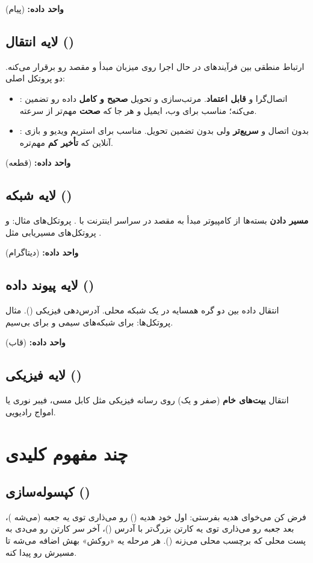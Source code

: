 \textbf{واحد داده:}  (پیام)

\subsection{لایه انتقال ()}
ارتباط منطقی بین فرآیندهای در حال اجرا روی میزبان مبدأ و مقصد رو برقرار می‌کنه. دو پروتکل اصلی:
\begin{itemize}
  \item {}: اتصال‌گرا و \textbf{قابل اعتماد}. مرتب‌سازی و تحویل \textbf{صحیح و کامل} داده رو تضمین می‌کنه؛ مناسب برای وب، ایمیل و هر جا که \textbf{صحت} مهم‌تر از سرعته.
  \item {}: بدون اتصال و \textbf{سریع‌تر} ولی بدون تضمین تحویل. مناسب برای استریم ویدیو و بازی آنلاین که \textbf{تأخیر کم} مهم‌تره.
\end{itemize}

\textbf{واحد داده:}  (قطعه)

\subsection{لایه شبکه ()}
\textbf{مسیر دادن} بسته‌ها از کامپیوتر مبدأ به مقصد در سراسر اینترنت با . پروتکل‌های مثال:  و پروتکل‌های مسیریابی مثل .

\textbf{واحد داده:}  (دیتاگرام)

\subsection{لایه پیوند داده ()}
انتقال داده بین دو گره همسایه در یک شبکه محلی. آدرس‌دهی فیزیکی (). مثال پروتکل‌ها:  برای شبکه‌های سیمی و  برای بی‌سیم.

\textbf{واحد داده:}  (قاب)

\subsection{لایه فیزیکی ()}
انتقال \textbf{بیت‌های خام} (صفر و یک) روی رسانه فیزیکی مثل کابل مسی، فیبر نوری یا امواج رادیویی.

\section{چند مفهوم کلیدی}
\subsection{کپسوله‌سازی ()}
فرض کن می‌خوای هدیه بفرستی: اول خود هدیه () رو می‌ذاری توی یه جعبه (می‌شه )، بعد جعبه رو می‌ذاری توی یه کارتن بزرگ‌تر با آدرس ()، آخر سر کارتن رو می‌دی به پست محلی که برچسب محلی می‌زنه (). هر مرحله یه «روکش» بهش اضافه می‌شه تا مسیرش رو پیدا کنه.

